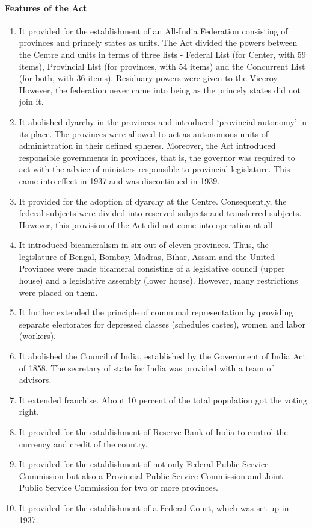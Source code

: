\paragraph{Features of the Act}
\begin{enumerate}
  \item It provided for the establishment of an All-India Federation consisting of provinces and princely states as units. The Act divided the powers between the Centre and units in terms of three lists - Federal List (for Center, with 59 items), Provincial List (for provinces, with 54 items) and the Concurrent List (for both, with 36 items). Residuary powers were given to the Viceroy. However, the federation never came into being as the princely states did not join it.
  \item It abolished dyarchy in the provinces and introduced `provincial autonomy' in its place. The provinces were allowed to act as autonomous units of administration in their defined spheres. Moreover, the Act introduced responsible governments in provinces, that is, the governor was required to act with the advice of ministers responsible to provincial legislature. This came into effect in 1937 and was discontinued in 1939.
  \item It provided for the adoption of dyarchy at the Centre. Consequently, the federal subjects were divided into reserved subjects and transferred subjects. However, this provision of the Act did not come into operation at all.
  \item It introduced bicameralism in six out of eleven provinces. Thus, the legislature of Bengal, Bombay, Madras, Bihar, Assam and the United Provinces were made bicameral consisting of a legislative council (upper house) and a legislative assembly (lower house). However, many restrictions were placed on them.
  \item It further extended the principle of communal representation by providing separate electorates for depressed classes (schedules castes), women and labor (workers).
  \item It abolished the Council of India, established by the Government of India Act of 1858. The secretary of state for India was provided with a team of advisors.
  \item It extended franchise. About 10 percent of the total population got the voting right.
  \item It provided for the establishment of Reserve Bank of India to control the currency and credit of the country.
  \item It provided for the establishment of not only Federal Public Service Commission but also a Provincial Public Service Commission and Joint Public Service Commission for two or more provinces.
  \item It provided for the establishment of a Federal Court, which was set up in 1937.
\end{enumerate}


